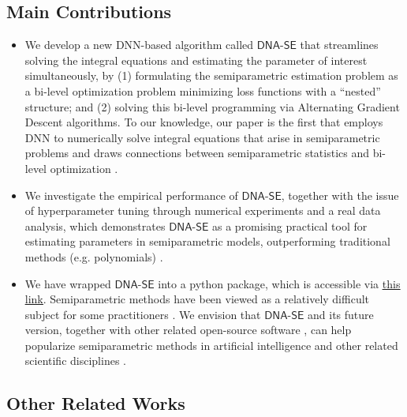 \documentclass{article}
\def\dnase{{\mathsf{DNA\mbox{-}SE}}}
\theoremstyle{plain}
\theoremstyle{definition}
\theoremstyle{remark}
\begin{document}
\subsection*{Main Contributions}
\allowdisplaybreaks
\begin{itemize}
\setlength\itemsep{0.5pt}
    \item We develop a new DNN-based algorithm called $\dnase$ that streamlines solving the integral equations and estimating the parameter of interest simultaneously, by (1) formulating the semiparametric estimation problem as a bi-level optimization problem minimizing loss functions with a ``nested'' structure; and (2) solving this bi-level programming via Alternating Gradient Descent algorithms. To our knowledge, our paper is the first that employs DNN to numerically solve integral equations that arise in semiparametric problems and draws connections between semiparametric statistics and bi-level optimization \citep{chen2021closing}. 
    \item We investigate the empirical performance of $\dnase$, together with the issue of hyperparameter tuning through numerical experiments and a real data analysis, which demonstrates $\dnase$ as a promising practical tool for estimating parameters in semiparametric models,  outperforming traditional methods (e.g. polynomials) \cite{atkinson1967numerical, ren1999simple}.
    \item We have wrapped $\dnase$ into a python package, which is accessible via \href{https://github.com/liuqs111/DNA-SE}{\underline{this link}}. Semiparametric methods have been viewed as a relatively difficult subject  for some practitioners \citep{ hines2022demystifying}. We envision that $\dnase$ and its future version, together with other related open-source software \citep{lee2023ananke}, can help popularize semiparametric methods in artificial intelligence and other related scientific disciplines \citep{pan2022knowledge, min2023nonparametric, wang2023scientific}.
\end{itemize}

\subsection*{Other Related Works}
\end{document}
